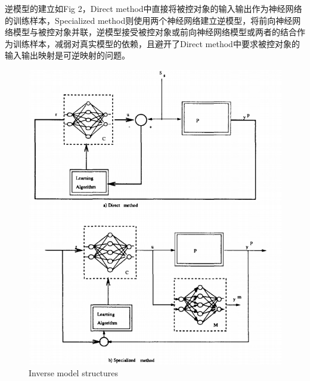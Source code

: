 \documentclass[12pt,onecolumn,letterpaper]{article}
\begin{document}
    逆模型的建立如Fig 2，Direct method中直接将被控对象的输入输出作为神经网络的训练样本，Specialized method则使用两个神经网络建立逆模型，将前向神经网络模型与被控对象并联，逆模型接受被控对象或前向神经网络模型或两者的结合作为训练样本，减弱对真实模型的依赖，且避开了Direct method中要求被控对象的输入输出映射是可逆映射的问题。
    \begin{figure}[htb]
        \centering
        \includegraphics[width=\linewidth]{figure/inverse.png}
        \caption{Inverse model structures\cite{hunt1992neural}}
    \end{figure}
\end{document}
